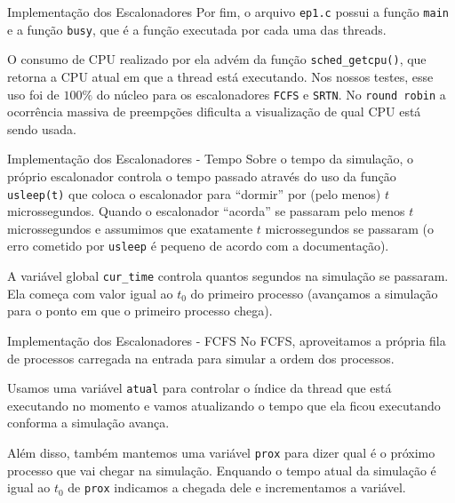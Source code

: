 \documentclass[10pt]{beamer}
\begin{document}
    \begin{frame}{Implementação dos Escalonadores}
        Por fim, o arquivo \texttt{ep1.c} possui a função \texttt{main} e a função
        \texttt{busy}, que é a função executada por cada uma das threads.

        O consumo de CPU realizado por ela advém da função \texttt{sched\_getcpu()},
        que retorna a CPU atual em que a thread está executando. Nos nossos testes,
        esse uso foi de $100\%$ do núcleo para os escalonadores \texttt{FCFS} e \texttt{SRTN}. No \texttt{round robin} a ocorrência massiva de preempções dificulta a visualização de qual CPU está sendo usada.

    \end{frame}
    \begin{frame}{Implementação dos Escalonadores - Tempo}
        Sobre o tempo da simulação, o próprio escalonador controla o tempo passado 
        através do uso da função \texttt{usleep(t)} que coloca o escalonador para ``dormir''
        por (pelo menos) $t$ microssegundos. Quando o escalonador ``acorda'' se passaram pelo
        menos $t$ microssegundos e assumimos que exatamente $t$ microssegundos se passaram (o erro cometido por \texttt{usleep} é pequeno de acordo com a documentação).

        A variável global \texttt{cur\_time} controla quantos segundos na simulação se passaram.
        Ela começa com valor igual ao $t_0$ do primeiro processo (avançamos a simulação para o ponto em que o primeiro processo chega).
    \end{frame}
    \begin{frame}{Implementação dos Escalonadores - FCFS}
        No FCFS, aproveitamos a própria fila de processos carregada na entrada para
        simular a ordem dos processos.

        Usamos uma variável \texttt{atual} para controlar o índice da thread que 
        está executando no momento e vamos atualizando o tempo que ela ficou 
        executando conforma a simulação avança.

        Além disso, também mantemos uma variável \texttt{prox} para dizer qual é
        o próximo processo que vai chegar na simulação. Enquando o tempo atual da
        simulação é igual ao $t_0$ de \texttt{prox} indicamos a chegada dele e
        incrementamos a variável.

    \end{frame}
\end{document}
